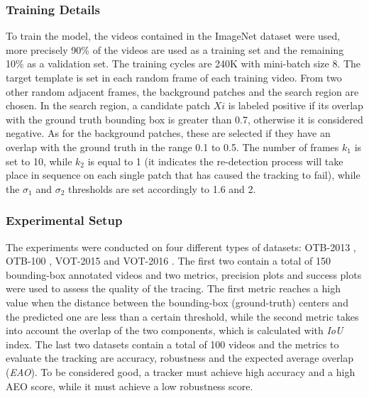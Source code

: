 \subsubsection{Training Details}
To train the model, the videos contained in the ImageNet dataset were used, 
more precisely 90\% of the videos are used as a training set and the remaining 
10\% as a validation set. The training cycles are 240K with mini-batch size 8. 
The target template is set in each random frame of each training video. From 
two other random adjacent frames, the background patches and the search 
region are chosen. In the search region, a candidate patch $Xi$ is labeled 
positive if its overlap with the ground truth bounding box is greater than 
0.7, otherwise it is considered negative. As for the background patches, these 
are selected if they have an overlap with the ground truth in the range 0.1 to 
0.5. The number of frames $k_1$ is set to 10, while $k_2$ is equal to 1 (it 
indicates the re-detection process will take place in sequence on each single 
patch that has caused the tracking to fail), while the $\sigma_1$ and $\sigma_2$ thresholds 
are set accordingly to 1.6 and 2.

\subsubsection{Experimental Setup}
The experiments were conducted on four different types of datasets: OTB-2013 
\cite{0893551142}, OTB-100 \cite{0893551143}, VOT-2015 \cite{0893551144} and VOT-2016 \cite{0893551140}. The first two contain 
a total of 150 bounding-box annotated videos and two metrics, precision 
plots and success plots were used to assess the quality of the tracing. The 
first metric reaches a high value when the distance between the bounding-box 
(ground-truth) centers and the predicted one are less than a certain threshold, 
while the second metric takes into account the overlap of the two components, 
which is calculated with \emph{IoU} index. The last two datasets contain 
a total of 100 videos and the metrics to evaluate the tracking are accuracy, 
robustness and the expected average overlap (\emph{EAO}). To be considered good, 
a tracker must achieve high accuracy and a high AEO score, while it must 
achieve a low robustness score.

